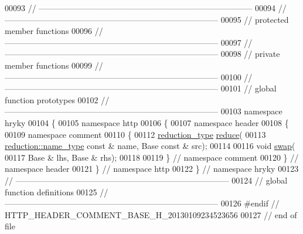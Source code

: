 \begin{DoxyCode}
00093 \textcolor{comment}{//
      ------------------------------------------------------------------------------}
00094 \textcolor{comment}{//
      ------------------------------------------------------------------------------}
00095 \textcolor{comment}{// protected member functions}
00096 \textcolor{comment}{//
      ------------------------------------------------------------------------------}
00097 \textcolor{comment}{//
      ------------------------------------------------------------------------------}
00098 \textcolor{comment}{// private member functions}
00099 \textcolor{comment}{//
      ------------------------------------------------------------------------------}
00100 \textcolor{comment}{//
      ------------------------------------------------------------------------------}
00101 \textcolor{comment}{// global function prototypes}
00102 \textcolor{comment}{//
      ------------------------------------------------------------------------------}
00103 \textcolor{keyword}{namespace }hryky
00104 \{
00105 \textcolor{keyword}{namespace }http
00106 \{
00107 \textcolor{keyword}{namespace }header
00108 \{
00109 \textcolor{keyword}{namespace }comment
00110 \{
00112     \hyperlink{namespacehryky_a343a9a4c36a586be5c2693156200eadc}{reduction_type} \hyperlink{namespacehryky_1_1http_a08fc36a78a8e2908140fcd102829a566}{reduce}(
00113         \hyperlink{namespacehryky_1_1reduction_ac686c30a4c8d196bbd0f05629a6b921f}{reduction::name_type} \textcolor{keyword}{const} & name, Base \textcolor{keyword}{const} & src);
00114 
00116     \textcolor{keywordtype}{void} \hyperlink{namespacehryky_1_1http_a38e62595ad532d18fbc65ceb61973aec}{swap}(
00117         Base & lhs, Base & rhs);
00118 
00119 \} \textcolor{comment}{// namespace comment}
00120 \} \textcolor{comment}{// namespace header}
00121 \} \textcolor{comment}{// namespace http}
00122 \} \textcolor{comment}{// namespace hryky}
00123 \textcolor{comment}{//
      ------------------------------------------------------------------------------}
00124 \textcolor{comment}{// global function definitions}
00125 \textcolor{comment}{//
      ------------------------------------------------------------------------------}
00126 \textcolor{preprocessor}{#endif // HTTP\_HEADER\_COMMENT\_BASE\_H\_20130109234523656}
00127 \textcolor{preprocessor}{}\textcolor{comment}{// end of file}
\end{DoxyCode}

